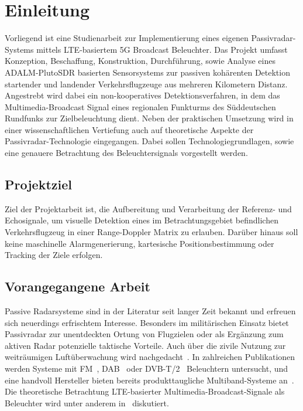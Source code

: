 \chapter{Einleitung}

Vorliegend ist eine Studienarbeit zur Implementierung eines eigenen Passivradar-Systems mittels LTE-basiertem 5G Broadcast Beleuchter. Das Projekt umfasst Konzeption, Beschaffung, Konstruktion, Durchführung, sowie Analyse eines ADALM-PlutoSDR basierten Sensorsystems zur passiven kohärenten Detektion startender und landender Verkehrsflugzeuge aus mehreren Kilometern Distanz. Angestrebt wird dabei ein non-kooperatives Detektionsverfahren, in dem das Multimedia-Broadcast Signal eines regionalen Funkturms des Süddeutschen Rundfunks zur Zielbeleuchtung dient. Neben der praktischen Umsetzung wird in einer wissenschaftlichen Vertiefung auch auf theoretische Aspekte der Passivradar-Technologie eingegangen. Dabei sollen Technologiegrundlagen, sowie eine genauere Betrachtung des Beleuchtersignals vorgestellt werden.

\section{Projektziel}

Ziel der Projektarbeit ist, die Aufbereitung und Verarbeitung der Referenz- und Echosignale, um visuelle Detektion eines im Betrachtungsgebiet befindlichen Verkehrsflugzeug in einer Range-Doppler Matrix zu erlauben. Darüber hinaus soll keine maschinelle Alarmgenerierung, kartesische Positionsbestimmung oder Tracking der Ziele erfolgen.

\section{Vorangegangene Arbeit}

Passive Radarsysteme sind in der Literatur seit langer Zeit bekannt und erfreuen sich neuerdings erfrischtem Interesse. Besonders im militärischen Einsatz bietet Passivradar zur unentdeckten Ortung von Flugzielen oder als Ergänzung zum aktiven Radar potenzielle taktische Vorteile. Auch über die zivile Nutzung zur weiträumigen Luftüberwachung wird nachgedacht~\cite{Stahl2018,Erhart2020}. In zahlreichen Publikationen werden Systeme mit FM~\cite{Lallo2008,Xie2018}, DAB~\cite{Winkler2021} oder DVB-T/2~\cite{Conti2016,Winkler2017} Beleuchtern untersucht, und eine handvoll Hersteller bieten bereits produkttaugliche Multiband-Systeme an~\cite{Lutz2018}. Die theoretische Betrachtung LTE-basierter Multimedia-Broadcast-Signale als Beleuchter wird unter anderem in~\cite{Klöck2019} diskutiert.

